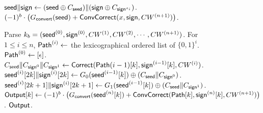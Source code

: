 \documentclass[sigconf]{acmart}
\newcommand{\seed}{{\sf seed}}
\newcommand{\sign}{{\sf sign}}
\begin{document}
\begin{figure*}
{{\begin{algorithmic}
      \State $\seed\|\sign\gets (\seed\oplus C_{\seed})\|(\sign\oplus C_{\sign^{x_i}})$. 
    \EndFor
    \State \Return $(-1)^b\cdot \big(G_{\sf convert}(\seed)+{\sf ConvCorrect}(x,\sign,CW^{(n+1)})\big)$. 
    \EndProcedure
    \item[]
    \State Parse $k_b=(\seed^{(0)},\sign^{(0)},CW^{(1)},CW^{(2)},\cdots,CW^{(n+1)})$. 
    \State For $1\le i\le n$, ${\sf Path}^{(i)}\gets$ the lexicographical ordered list of $\{0,1\}^i$. ${\sf Path}^{(0)}\gets[\epsilon]$. 
        \State $C_\seed\|C_{\sign^0}\|C_{\sign^1}\gets {\sf Correct}({\sf Path}{(i-1)}[k],\sign^{(i-1)}[k],CW^{(i)})$.
        \State $\seed^{(i)}[2k]\|\sign^{(i)}[2k]\gets G_0(\seed^{(i-1)}[k])\oplus (C_\seed\|C_{\sign^0})$.
        \State $\seed^{(i)}[2k+1]\|\sign^{(i)}[2k+1]\gets G_1(\seed^{(i-1)}[k])\oplus (C_\seed\|C_{\sign^1})$.
      \EndFor
    \EndFor
      \State ${\sf Output}[k]\gets (-1)^b\cdot \big(G_{\sf convert}(\seed^{(n)}[k])+{\sf ConvCorrect}({\sf Path}[k],\sign^{(n)}[k],CW^{(n+1)})\big)$.
    \EndFor
    \State\Return $\sf Output$. 
    \EndProcedure
    \end{algorithmic}}}
\end{figure*}
\end{document}
